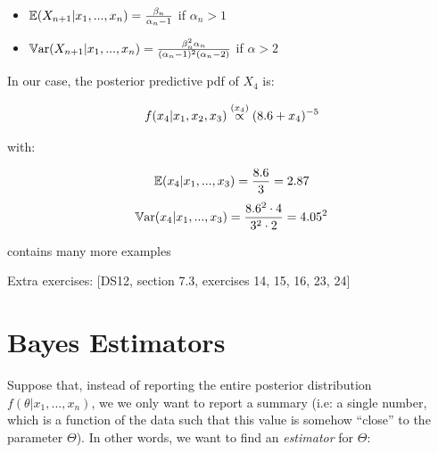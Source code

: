 \documentclass[a4paper]{article}
\begin{document}
                \begin{itemize}
                    \item $\mathbb{E}(X_{n+1} | x_1, ..., x_n) = \frac{\beta_n}{\alpha_n
                        - 1}$ if $\alpha_n > 1$
                    \item $\mathbb{V}\text{ar}(X_{n+1} | x_1, ..., x_n) = \frac{\beta_n^2
                        \alpha_n}{(\alpha_n - 1)^2(\alpha_n - 2)}$ if $\alpha >
                        2$
                \end{itemize}

                In our case, the posterior predictive pdf of $X_4$ is:

                \[
                    f(x_4 | x_1, x_2, x_3) \stackrel{({x_4})}{\propto} (8.6 + x_4)^{-5}
                \]

                with:

                \[
                    \mathbb{E}(x_4 | x_1, ..., x_3) = \frac{8.6}{3} = 2.87
                \]
                \[
                    \mathbb{V}\text{ar}(x_4 | x_1, ..., x_3) = \frac{8.6^2 \cdot 4}{3^2 \cdot 2
                    } = 4.05^2
                \]

                \begin{fread}
                    [DS12, section 7.3] contains many more examples
                \end{fread}

                \begin{relq}

                    Extra exercises: [DS12, section 7.3, exercises 14, 15, 16,
                    23, 24]
                \end{relq}

    \newpage
    \section{Bayes Estimators}
        \begin{fread}
            [DS12, section 7.4]
        \end{fread}

        Suppose that, instead of reporting the entire posterior distribution
        $f(\theta | x_1, ..., x_n)$, we we only want to report a summary (i.e: a
        single number, which is a function of the data such that this value is
        somehow ``close'' to the parameter $\Theta$). In other words, we want to
        find an \textit{estimator} for $\Theta$:
\end{document}
